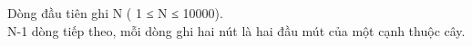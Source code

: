 Dòng đầu tiên ghi N ( 1 ≤ N ≤ 10000).
\\N-1 dòng tiếp theo, mỗi dòng ghi hai nút là hai đầu mút của một cạnh thuộc cây.